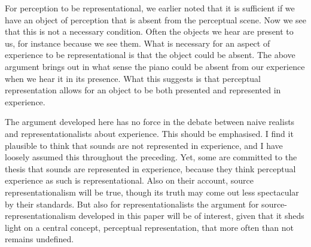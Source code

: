\documentclass[sloppy, journal, git, bytitle, dodraft]{humapap}
\begin{document}
For perception to be representational, we earlier noted that it is sufficient if we have an object of perception that is absent from the perceptual scene. Now we see that this is not a necessary condition. Often the objects we hear are present to us, for instance because we see them. What is necessary for an aspect of experience to be representational is that the object could be absent. The above argument brings out in what sense the piano could be absent from our experience when we hear it in its presence. What this suggests is that perceptual representation allows for an object to be both presented and represented in experience. 

The argument developed here has no force in the debate between naive realists and representationalists about experience. This should be emphasised. I find it plausible to think that sounds are not represented in experience, and I have loosely assumed this throughout the preceding. Yet, some are committed to the thesis that sounds are represented in experience, because they think perceptual experience as such is representational. Also on their account, source representationalism will be true, though its truth may come out less spectacular by their standards. But also for representationalists the argument for source-representationalism developed in this paper will be of interest, given that it sheds light on a central concept, perceptual representation, that more often than not remains undefined. 




% 
% 
% 


\printbibliography
\end{document}
